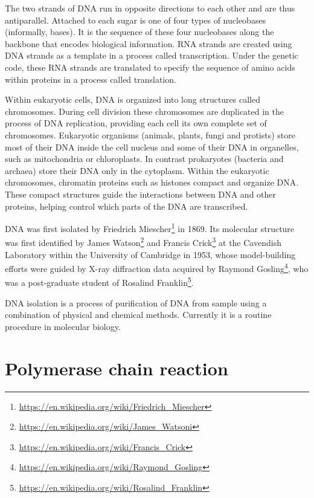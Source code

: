 \documentclass[]{book}
\let\rmarkdownfootnote\footnote%
\def\footnote{\protect\rmarkdownfootnote}
\renewcommand{\href}[2]{#2\footnote{\url{#1}}}
\theoremstyle{definition}
\theoremstyle{definition}
\theoremstyle{definition}
\theoremstyle{remark}
\begin{document}
The two strands of DNA run in opposite directions to each other and are
thus antiparallel. Attached to each sugar is one of four types of
nucleobases (informally, bases). It is the sequence of these four
nucleobases along the backbone that encodes biological information. RNA
strands are created using DNA strands as a template in a process called
transcription. Under the genetic code, these RNA strands are translated
to specify the sequence of amino acids within proteins in a process
called translation.

Within eukaryotic cells, DNA is organized into long structures called
chromosomes. During cell division these chromosomes are duplicated in
the process of DNA replication, providing each cell its own complete set
of chromosomes. Eukaryotic organisms (animals, plants, fungi and
protists) store most of their DNA inside the cell nucleus and some of
their DNA in organelles, such as mitochondria or chloroplasts. In
contrast prokaryotes (bacteria and archaea) store their DNA only in the
cytoplasm. Within the eukaryotic chromosomes, chromatin proteins such as
histones compact and organize DNA. These compact structures guide the
interactions between DNA and other proteins, helping control which parts
of the DNA are transcribed.

DNA was first isolated by
\href{https://en.wikipedia.org/wiki/Friedrich_Miescher}{Friedrich
Miescher} in 1869. Its molecular structure was first identified by
\href{https://en.wikipedia.org/wiki/James_Watsoni}{James Watson} and
\href{https://en.wikipedia.org/wiki/Francis_Crick}{Francis Crick} at the
Cavendish Laboratory within the University of Cambridge in 1953, whose
model-building efforts were guided by X-ray diffraction data acquired by
\href{https://en.wikipedia.org/wiki/Raymond_Gosling}{Raymond Gosling},
who was a post-graduate student of
\href{https://en.wikipedia.org/wiki/Rosalind_Franklin}{Rosalind
Franklin}.

DNA isolation is a process of purification of DNA from sample using a
combination of physical and chemical methods. Currently it is a routine
procedure in molecular biology.

\section{Polymerase chain reaction}\label{polymerase-chain-reaction}
\end{document}
